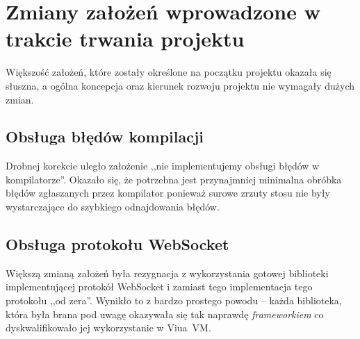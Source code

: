 
\section{Zmiany założeń wprowadzone w trakcie trwania projektu}

Większość założeń, które zostały określone na początku projektu okazała się
słuszna, a ogólna koncepcja oraz kierunek rozwoju projektu nie wymagały dużych
zmian.

\subsection{Obsługa błędów kompilacji}

Drobnej korekcie uległo założenie ,,nie implementujemy obsługi błędów w
kompilatorze''. Okazało się, że potrzebna jest przynajmniej minimalna obróbka
błędów zgłaszanych przez kompilator ponieważ surowe zrzuty stosu nie były
wystarczające do szybkiego odnajdowania błędów.

\subsection{Obsługa protokołu WebSocket}

Większą zmianą założeń była rezygnacja z wykorzystania gotowej biblioteki
implementującej protokół WebSocket i zamiast tego implementacja tego protokołu
,,od zera''. Wynikło to z bardzo prostego powodu -- każda biblioteka, która
była brana pod uwagę okazywała się tak naprawdę \emph{frameworkiem} co
dyskwalifikowało jej wykorzystanie w Viua~VM.

